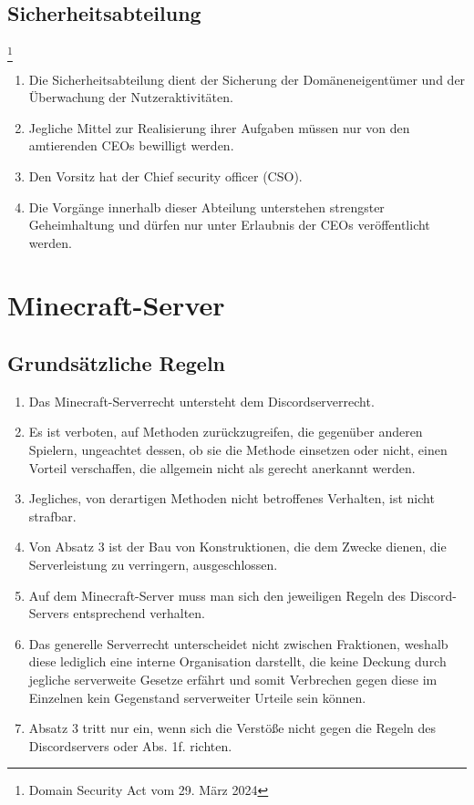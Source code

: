 \documentclass{article}
\begin{document}
\subsection{Sicherheitsabteilung}\footnote{Domain Security Act vom 29. März 2024}
\begin{enumerate}[(1)]
	\item Die Sicherheitsabteilung dient der Sicherung der Domäneneigentümer und der Überwachung der Nutzeraktivitäten.
	\item Jegliche Mittel zur Realisierung ihrer Aufgaben müssen nur von den amtierenden CEOs bewilligt werden.
	\item Den Vorsitz hat der Chief security officer (CSO).
	\item Die Vorgänge innerhalb dieser Abteilung unterstehen strengster Geheimhaltung und dürfen nur unter Erlaubnis der CEOs veröffentlicht werden.
\end{enumerate}

\section{Minecraft-Server}
\subsection{Grundsätzliche Regeln}
\begin{enumerate}[(1)]
	\item Das Minecraft-Serverrecht untersteht dem Discordserverrecht.
	\item Es ist verboten, auf Methoden zurückzugreifen, die gegenüber anderen Spielern, ungeachtet dessen, ob sie die Methode einsetzen oder nicht, einen Vorteil verschaffen, die allgemein nicht als gerecht anerkannt werden.
	\item Jegliches, von derartigen Methoden nicht betroffenes Verhalten, ist nicht strafbar.
	\item Von Absatz 3 ist der Bau von Konstruktionen, die dem Zwecke dienen, die Serverleistung zu verringern, ausgeschlossen.
	\item Auf dem Minecraft-Server muss man sich den jeweiligen Regeln des Discord-Servers entsprechend verhalten.
	\item Das generelle Serverrecht unterscheidet nicht zwischen Fraktionen, weshalb diese lediglich eine interne Organisation darstellt, die keine Deckung durch jegliche serverweite Gesetze erfährt und somit Verbrechen gegen diese im Einzelnen kein Gegenstand serverweiter Urteile sein können.
	\item Absatz 3 tritt nur ein, wenn sich die Verstöße nicht gegen die Regeln des Discordservers oder Abs. 1f. richten.
\end{enumerate}
\end{document}
